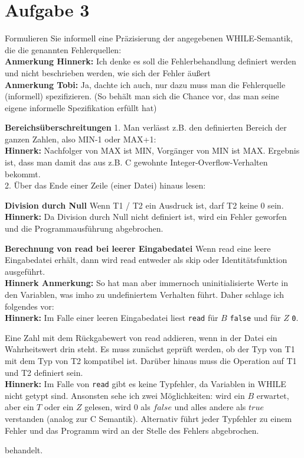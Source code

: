 \documentclass[ngerman,a4paper]{report}
\begin{document}
\section*{Aufgabe 3}
Formulieren Sie informell eine Präzisierung der angegebenen WHILE-Semantik, die die genannten Fehlerquellen:\\
\textbf{Anmerkung Hinnerk:} Ich denke es soll die Fehlerbehandlung definiert werden und nicht beschrieben werden, wie sich der Fehler äußert\\
\textbf{Anmerkung Tobi:} Ja, dachte ich auch, nur dazu muss man die Fehlerquelle (informell) spezifizieren. (So behält man sich die Chance vor, das man seine eigene informelle Spezifikation erfüllt hat)\\
\begin{compactenum}
\item [\textbf{Bereichsüberschreitungen}] 1. Man verlässt z.B. den definierten Bereich der ganzen Zahlen, also MIN-1 oder MAX+1: 
	\\ \textbf{Hinnerk:} Nachfolger von MAX ist MIN, Vorgänger von MIN ist MAX. Ergebnis ist, dass man damit das aus z.B. C gewohnte Integer-Overflow-Verhalten bekommt.
	\\ 2. Über das Ende einer Zeile (einer Datei) hinaus lesen:
\item [\textbf{Division durch Null}] Wenn T1 / T2 ein Ausdruck ist, darf T2 keine 0 sein.
	\\ \textbf{Hinnerk:} Da Division durch Null nicht definiert ist, wird ein Fehler geworfen und die Programmausführung abgebrochen.
\item [\textbf{Berechnung von read bei leerer Eingabedatei}] Wenn read eine leere Eingabedatei erhält, dann wird read entweder als skip oder Identitätsfunktion ausgeführt.
	\\ \textbf{Hinnerk Anmerkung:} So hat man aber immernoch uninitialisierte Werte in den Variablen, was imho zu undefiniertem Verhalten führt. Daher schlage ich folgendes vor:
	\\ \textbf{Hinnerk:} Im Falle einer leeren Eingabedatei liest \lstinline{read} für $B$ \lstinline{false} und für $Z$ \lstinline{0}.
\item [\textbf{Typkonflikte}] Eine Zahl mit dem Rückgabewert von read addieren, wenn in der Datei ein Wahrheitswert drin steht. Es muss zunächst geprüft werden, ob der Typ von T1 mit dem Typ von T2 kompatibel ist. Darüber hinaus muss die Operation auf T1 und T2 definiert sein.
	\\ \textbf{Hinnerk:} Im Falle von \lstinline{read} gibt es keine Typfehler, da Variablen in WHILE nicht getypt sind.
	Ansonsten sehe ich zwei Möglichkeiten: wird ein $B$ erwartet, aber ein $T$ oder ein $Z$ gelesen, wird $0$ als $false$ und alles andere als $true$ verstanden (analog zur C Semantik). Alternativ führt jeder Typfehler zu einem Fehler und das Programm wird an der Stelle des Fehlers abgebrochen.
\end{compactenum}
behandelt.
\end{document}

